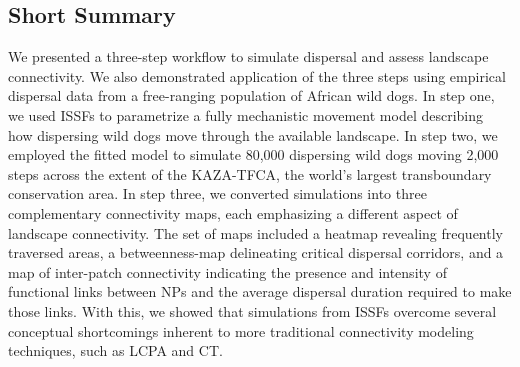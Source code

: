 \documentclass[abstract=on,10pt,a4paper,bibliography=totocnumbered]{article}
\begin{document}
\subsection{Short Summary}
We presented a three-step workflow to simulate dispersal and assess landscape
connectivity. We also demonstrated application of the three steps using
empirical dispersal data from a free-ranging population of African wild dogs. In
step one, we used ISSFs to parametrize a fully mechanistic movement model
describing how dispersing wild dogs move through the available landscape. In
step two, we employed the fitted model to simulate 80,000 dispersing wild dogs
moving 2,000 steps across the extent of the KAZA-TFCA, the world's largest
transboundary conservation area. In step three, we converted simulations into
three complementary connectivity maps, each emphasizing a different aspect of
landscape connectivity. The set of maps included a heatmap revealing frequently
traversed areas, a betweenness-map delineating critical dispersal corridors, and
a map of inter-patch connectivity indicating the presence and intensity of
functional links between NPs and the average dispersal duration required to make
those links. With this, we showed that simulations from ISSFs overcome several
conceptual shortcomings inherent to more traditional connectivity modeling
techniques, such as LCPA and CT.

\end{document}
